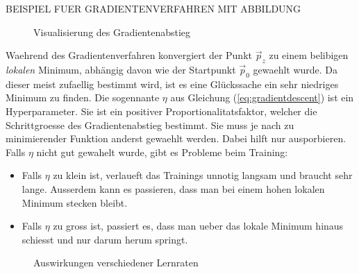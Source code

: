 \documentclass[../main]{subfiles}
\begin{document}
BEISPIEL FUER GRADIENTENVERFAHREN MIT ABBILDUNG

\begin{figure}[h!]
  \centering

  \caption{Visualisierung des Gradientenabstieg}
\end{figure}

Waehrend des Gradientenverfahren konvergiert der Punkt $\vec{p}_z$ zu einem belibigen \textit{lokalen} Minimum, abhängig davon wie der Startpunkt $\vec{p}_0$ gewaehlt wurde.
Da dieser meist zufaellig bestimmt wird, ist es eine Glückssache ein sehr niedriges Minimum zu finden.
\para
Die sogennante  $\eta$ aus Gleichung (\ref{eq:gradientdescent}) ist ein Hyperparameter.
Sie ist ein positiver Proportionalitatsfaktor, welcher die Schrittgroesse des Gradientenabstieg bestimmt. Sie muss je nach zu minimierender Funktion anderst gewaehlt werden.
Dabei hilft nur ausporbieren. Falls $\eta$ nicht gut gewahelt wurde, gibt es Probleme beim Training:
\begin{itemize}
\item{Falls $\eta$ zu klein ist, verlaueft das Trainings unnotig langsam und braucht sehr lange.
    Ausserdem kann es passieren, dass man bei einem hohen lokalen Minimum stecken bleibt.}

\item{Falls $\eta$ zu gross ist, passiert es, dass man ueber das lokale Minimum hinaus schiesst und nur darum herum springt.}
\end{itemize}

\begin{figure}[h!]
  \centering
  \caption{Auswirkungen verschiedener Lernraten}
\end{figure}
\end{document}
